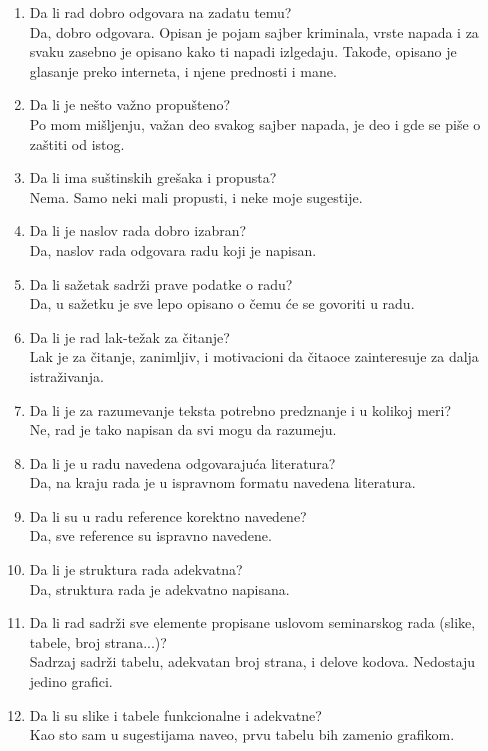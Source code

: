 \documentclass[a4paper]{report}
\begin{document}
\begin{enumerate}
\item Da li rad dobro odgovara na zadatu temu?\\
Da, dobro odgovara. Opisan je pojam sajber kriminala, vrste napada i za svaku zasebno je opisano kako ti napadi izlgedaju. Takođe, opisano je glasanje preko interneta, i njene prednosti i mane.
\item Da li je nešto važno propušteno?\\
Po mom mišljenju, važan deo svakog sajber napada, je deo i gde se piše o zaštiti od istog.
\item Da li ima suštinskih grešaka i propusta?\\
Nema. Samo neki mali propusti, i neke moje sugestije.
\item Da li je naslov rada dobro izabran?\\
Da, naslov rada odgovara radu koji je napisan.
\item Da li sažetak sadrži prave podatke o radu?\\
Da, u sažetku je sve lepo opisano o čemu će se govoriti u radu.
\item Da li je rad lak-težak za čitanje?\\
Lak je za čitanje, zanimljiv, i motivacioni da čitaoce zainteresuje za dalja istraživanja.
\item Da li je za razumevanje teksta potrebno predznanje i u kolikoj meri?\\
Ne, rad je tako napisan da svi mogu da razumeju.
\item Da li je u radu navedena odgovarajuća literatura?\\
Da, na kraju rada je u ispravnom formatu navedena literatura.
\item Da li su u radu reference korektno navedene?\\
Da, sve reference su ispravno navedene.
\item Da li je struktura rada adekvatna?\\
Da, struktura rada je adekvatno napisana. 
\item Da li rad sadrži sve elemente propisane uslovom seminarskog rada (slike, tabele, broj strana...)?\\
Sadrzaj sadrži tabelu, adekvatan broj strana, i delove kodova. Nedostaju jedino grafici.
\item Da li su slike i tabele funkcionalne i adekvatne?\\
Kao sto sam u sugestijama naveo, prvu tabelu bih zamenio grafikom.
\end{enumerate}
\end{document}
